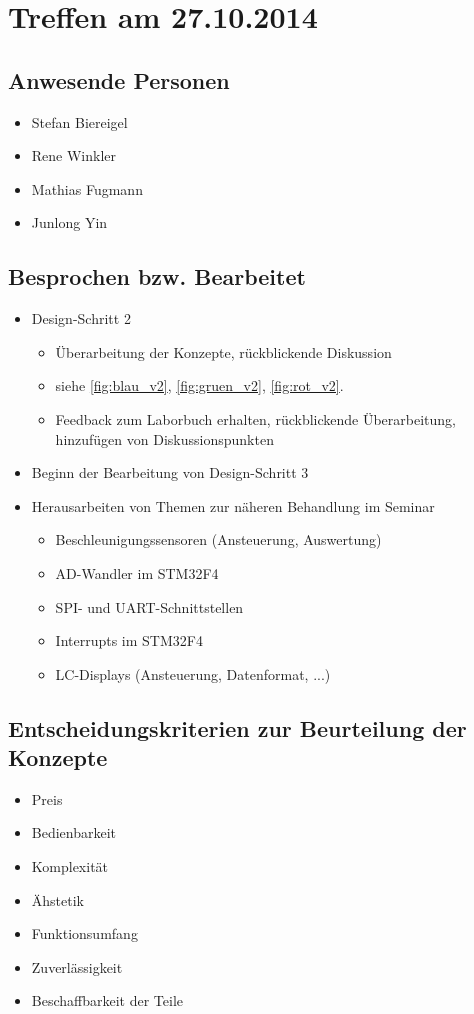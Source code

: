 \chapter{Treffen am 27.10.2014}
\section{Anwesende Personen}
\begin{itemize}
	\item Stefan Biereigel
	\item Rene Winkler
	\item Mathias Fugmann
	\item Junlong Yin
\end{itemize}

\section{Besprochen bzw. Bearbeitet}
\begin{itemize}
	\item Design-Schritt 2
	\begin{itemize}
		\item Überarbeitung der Konzepte, rückblickende Diskussion
		\item siehe \autoref{fig:blau_v2}, \autoref{fig:gruen_v2}, \autoref{fig:rot_v2}.
		\item Feedback zum Laborbuch erhalten, rückblickende Überarbeitung, hinzufügen von Diskussionspunkten
	\end{itemize}
	\item Beginn der Bearbeitung von Design-Schritt 3
	\item Herausarbeiten von Themen zur näheren Behandlung im Seminar
	\begin{itemize}
		\item Beschleunigungssensoren (Ansteuerung, Auswertung)
		\item AD-Wandler im STM32F4
		\item SPI- und UART-Schnittstellen
		\item Interrupts im STM32F4
		\item LC-Displays (Ansteuerung, Datenformat, ...)
	\end{itemize}
\end{itemize}

\section{Entscheidungskriterien zur Beurteilung der Konzepte}
\label{chap:kriterien}
\begin{itemize}
	\item Preis
	\item Bedienbarkeit
	\item Komplexität
	\item Ähstetik
	\item Funktionsumfang
	\item Zuverlässigkeit
	\item Beschaffbarkeit der Teile
\end{itemize}